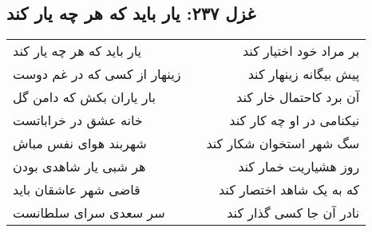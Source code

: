 \begin{center}
\section*{غزل ۲۳۷: یار باید که هر چه یار کند}
\label{sec:237}
\begin{longtable}{l p{0.5cm} r}
یار باید که هر چه یار کند
&&
بر مراد خود اختیار کند
\\
زینهار از کسی که در غم دوست
&&
پیش بیگانه زینهار کند
\\
بار یاران بکش که دامن گل
&&
آن برد کاحتمال خار کند
\\
خانه عشق در خراباتست
&&
نیکنامی در او چه کار کند
\\
شهربند هوای نفس مباش
&&
سگ شهر استخوان شکار کند
\\
هر شبی یار شاهدی بودن
&&
روز هشیاریت خمار کند
\\
قاضی شهر عاشقان باید
&&
که به یک شاهد اختصار کند
\\
سر سعدی سرای سلطانست
&&
نادر آن جا کسی گذار کند
\\
\end{longtable}
\end{center}

